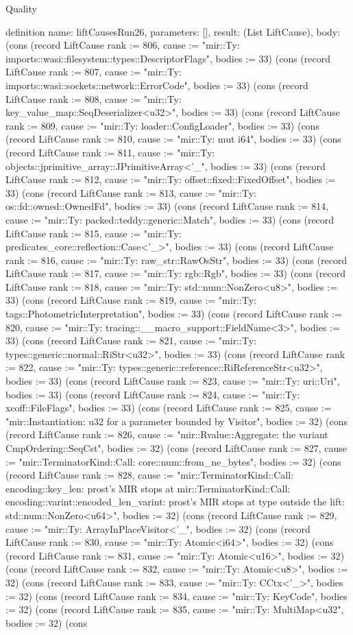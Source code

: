 \begin{lexlean}{Quality}
\begin{semanticmodule}
definition{
  name: liftCausesRun26,
  parameters: [],
  result: (List LiftCause),
  body: (cons (record LiftCause {rank := 806, cause := "mir::Ty: imports::wasi::filesystem::types::DescriptorFlags", bodies := 33}) (cons (record LiftCause {rank := 807, cause := "mir::Ty: imports::wasi::sockets::network::ErrorCode", bodies := 33}) (cons (record LiftCause {rank := 808, cause := "mir::Ty: key_value_map::SeqDeserializer<u32>", bodies := 33}) (cons (record LiftCause {rank := 809, cause := "mir::Ty: loader::ConfigLoader", bodies := 33}) (cons (record LiftCause {rank := 810, cause := "mir::Ty: mut i64", bodies := 33}) (cons (record LiftCause {rank := 811, cause := "mir::Ty: objects::jprimitive_array::JPrimitiveArray<'_", bodies := 33}) (cons (record LiftCause {rank := 812, cause := "mir::Ty: offset::fixed::FixedOffset", bodies := 33}) (cons (record LiftCause {rank := 813, cause := "mir::Ty: os::fd::owned::OwnedFd", bodies := 33}) (cons (record LiftCause {rank := 814, cause := "mir::Ty: packed::teddy::generic::Match", bodies := 33}) (cons (record LiftCause {rank := 815, cause := "mir::Ty: predicates_core::reflection::Case<'_>", bodies := 33}) (cons (record LiftCause {rank := 816, cause := "mir::Ty: raw_str::RawOsStr", bodies := 33}) (cons (record LiftCause {rank := 817, cause := "mir::Ty: rgb::Rgb", bodies := 33}) (cons (record LiftCause {rank := 818, cause := "mir::Ty: std::num::NonZero<u8>", bodies := 33}) (cons (record LiftCause {rank := 819, cause := "mir::Ty: tags::PhotometricInterpretation", bodies := 33}) (cons (record LiftCause {rank := 820, cause := "mir::Ty: tracing::__macro_support::FieldName<3>", bodies := 33}) (cons (record LiftCause {rank := 821, cause := "mir::Ty: types::generic::normal::RiStr<u32>", bodies := 33}) (cons (record LiftCause {rank := 822, cause := "mir::Ty: types::generic::reference::RiReferenceStr<u32>", bodies := 33}) (cons (record LiftCause {rank := 823, cause := "mir::Ty: uri::Uri", bodies := 33}) (cons (record LiftCause {rank := 824, cause := "mir::Ty: xcoff::FileFlags", bodies := 33}) (cons (record LiftCause {rank := 825, cause := "mir::Instantiation: u32 for a parameter bounded by Visitor", bodies := 32}) (cons (record LiftCause {rank := 826, cause := "mir::Rvalue::Aggregate: the variant CmpOrdering::SeqCst", bodies := 32}) (cons (record LiftCause {rank := 827, cause := "mir::TerminatorKind::Call: core::num::from_ne_bytes", bodies := 32}) (cons (record LiftCause {rank := 828, cause := "mir::TerminatorKind::Call: encoding::key_len: prost's MIR stops at mir::TerminatorKind::Call: encoding::varint::encoded_len_varint: prost's MIR stops at type outside the lift: std::num::NonZero<u64>", bodies := 32}) (cons (record LiftCause {rank := 829, cause := "mir::Ty: ArrayInPlaceVisitor<'_", bodies := 32}) (cons (record LiftCause {rank := 830, cause := "mir::Ty: Atomic<i64>", bodies := 32}) (cons (record LiftCause {rank := 831, cause := "mir::Ty: Atomic<u16>", bodies := 32}) (cons (record LiftCause {rank := 832, cause := "mir::Ty: Atomic<u8>", bodies := 32}) (cons (record LiftCause {rank := 833, cause := "mir::Ty: CCtx<'_>", bodies := 32}) (cons (record LiftCause {rank := 834, cause := "mir::Ty: KeyCode", bodies := 32}) (cons (record LiftCause {rank := 835, cause := "mir::Ty: MultiMap<u32", bodies := 32}) (cons }
\end{semanticmodule}
\end{lexlean}
